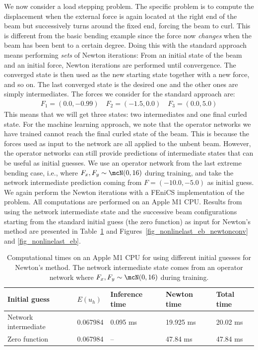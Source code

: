 \documentclass[12pt]{article}
\begin{document}
We now consider a load stepping problem. The specific problem is to compute the displacement when the external force is again located at the right end of the beam but successively turns around the fixed end, forcing the beam to curl. This is different from the basic bending example since the force now \emph{changes} when the beam has been bent to a certain degree. Doing this with the standard approach means performing \emph{sets} of Newton iterations: From an initial state of the beam and an initial force, Newton iterations are performed until convergence. The converged state is then used as the new starting state together with a new force, and so on. The last converged state is the desired one and the other ones are simply intermediates. The forces we consider for the standard approach are:
\begin{align}
F_1 = (0.0, -0.99) \quad F_2 = (-1.5, 0.0) \quad F_3 = (0.0, 5.0)
\end{align}
This means that we will get three states: two intermediates and one final curled state. For the machine learning approach, we note that the operator networks we have trained cannot reach the final curled state of the beam. This is because the forces used as input to the network are all applied to the unbent beam. However, the operator networks can still provide predictions of intermediate states that can be useful as initial guesses. We use an operator network from the last extreme bending case, i.e., where $F_x, F_y \sim \mcN(0, 16)$ during training, and take the network intermediate prediction coming from $F = (-10.0, -5.0)$ as initial guess. We again perform the Newton iterations with a FEniCS implementation of the problem. All computations are performed on an Apple M1 CPU. Results from using the network intermediate state and the successive beam configurations starting from the standard initial guess (the zero function) as input for Newton's method are presented in Table~\ref{table_nonlinelast_newtontimes_eb} and Figures~\ref{fig_nonlinelast_eb_newtonconv} and \ref{fig_nonlinelast_eb}.

\begin{table}[h!]
	\caption{Computational times on an Apple M1 CPU for using different initial guesses for Newton's method. The network intermediate state comes from an operator network where $F_x, F_y \sim \mcN(0, 16)$ during training.}
	\centering
	\begin{tabular}{|l|l|l|l|l|}
		\hline
		Initial guess & $E(u_h)$ & Inference time & Newton time & Total time  \\ \hline
		Network intermediate & 0.067984 & 0.095 ms & 19.925 ms & 20.02 ms \\ \hline
		Zero function & 0.067984 & -- & 47.84 ms & 47.84 ms \\ \hline
	\end{tabular}\label{table_nonlinelast_newtontimes_eb}
\end{table}
\end{document}
